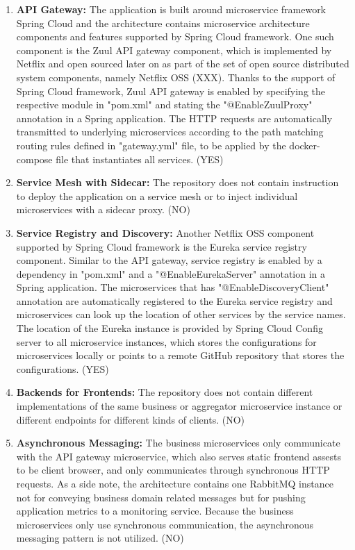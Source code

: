 \documentclass{Configuration_Files/PoliMi3i_thesis}
\begin{document}
\begin{enumerate}
    \item \textbf{API Gateway:} The application is built around microservice framework Spring Cloud and the architecture contains microservice architecture components and features supported by Spring Cloud framework. 
    One such component is the Zuul API gateway component, which is implemented by Netflix and open sourced later on as part of the set of open source distributed system components, namely  Netflix OSS (XXX).
    Thanks to the support of Spring Cloud framework, Zuul API gateway is enabled by specifying the respective module in "pom.xml" and stating the "@EnableZuulProxy" annotation in a Spring application.
    The HTTP requests are automatically transmitted to underlying microservices according to the path matching routing rules defined in "gateway.yml" file, to be applied by the docker-compose file that instantiates all services. (YES)
    
    \item \textbf{Service Mesh with Sidecar:} The repository does not contain instruction to deploy the application on a service mesh or to inject individual microservices with a sidecar proxy. (NO)
    
    \item \textbf{Service Registry and Discovery:} Another Netflix OSS component supported by Spring Cloud framework is the Eureka service registry component.
    Similar to the API gateway, service registry is enabled by a dependency in "pom.xml" and a "@EnableEurekaServer" annotation in a Spring application.
    The microservices that has "@EnableDiscoveryClient" annotation are automatically registered to the Eureka service registry and microservices can look up the location of other services by the service names.
    The location of the Eureka instance is provided by Spring Cloud Config server to all microservice instances, which stores the configurations for microservices locally or points to a remote GitHub repository that stores the configurations. (YES)
    
    \item \textbf{Backends for Frontends:} The repository does not contain different implementations of the same business or aggregator microservice instance or different endpoints for different kinds of clients. (NO)
    
    \item \textbf{Asynchronous Messaging:} The business microservices only communicate with the API gateway microservice, which also serves static frontend assests to be client browser, and only communicates through synchronous HTTP requests.
    As a side note, the architecture contains one RabbitMQ instance not for conveying business domain related messages but for pushing application metrics to a monitoring service.
    Because the business microservices only use synchronous communication, the asynchronous messaging pattern is not utilized. (NO)
    

\end{enumerate}
\end{document}
